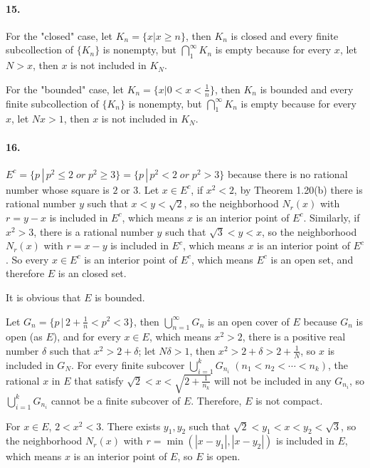 \documentclass[a4paper]{article}
\begin{document}
\paragraph{15.}
\quad

For the "closed" case, let $K_n=\{x|x\geq n\}$, then $K_n$ is closed and every finite subcollection of $\{K_n\}$ is nonempty, but $\bigcap_1^\infty K_n$ is empty because for every $x$, let $N>x$, then $x$ is not included in $K_N$.
\medskip

For the "bounded" case, let $K_n=\{x|0<x<\frac{1}{n}\}$, then $K_n$ is bounded and every finite subcollection of $\{K_n\}$ is nonempty, but $\bigcap_1^\infty K_n$ is empty because for every $x$, let $Nx>1$, then $x$ is not included in $K_N$.

\paragraph{16.}
$E^c=\{p\,|\,p^2\leq2\;or\;p^2\geq3\}=\{p\,|\,p^2<2\;or\;p^2>3\}$ because there is no rational number whose square is $2$ or $3$. Let $x\in E^c$, if $x^2<2$, by Theorem 1.20(b) there is rational number $y$ such that $x<y<\sqrt{2}$, so the neighborhood $N_r(x)$ with $r=y-x$ is included in $E^c$, which means $x$ is an interior point of $E^c$. Similarly, if $x^2>3$, there is a rational number $y$ such that $\sqrt{3}<y<x$, so the neighborhood $N_r(x)$ with $r=x-y$ is included in $E^c$, which means $x$ is an interior point of $E^c$. So every $x\in E^c$ is an interior point of $E^c$, which means $E^c$ is an open set, and therefore $E$ is an closed set. 

It is obvious that $E$ is bounded.

Let $G_n=\{p\,|\,2+\frac{1}{n}<p^2<3\}$, then $\bigcup_{n=1}^\infty G_n$ is an open cover of $E$ because $G_n$ is open (as $E$), and for every $x\in E$, which means $x^2>2$, there is a positive real number $\delta$ such that $x^2>2+\delta$; let $N\delta>1$, then $x^2>2+\delta>2+\frac{1}{N}$, so $x$ is included in $G_N$. For every finite subcover $\bigcup_{i=1}^kG_{n_i}\;(n_1<n_2<\cdots<n_k)$, the rational $x$ in $E$ that satisfy $\sqrt{2}<x<\sqrt{2+\frac{1}{n_k}}$ will not be included in any $G_{n_i}$, so $\bigcup_{i=1}^kG_{n_i}$ cannot be a finite subcover of $E$. Therefore, $E$ is not compact.

For $x\in E$, $2<x^2<3$. There exists $y_1,y_2$ such that $\sqrt{2}<y_1<x<y_2<\sqrt{3}$, so the neighborhood $N_r(x)$ with $r=\min(|x-y_1|,|x-y_2|)$ is included in $E$, which means $x$ is an interior point of $E$, so $E$ is open.
\end{document}
